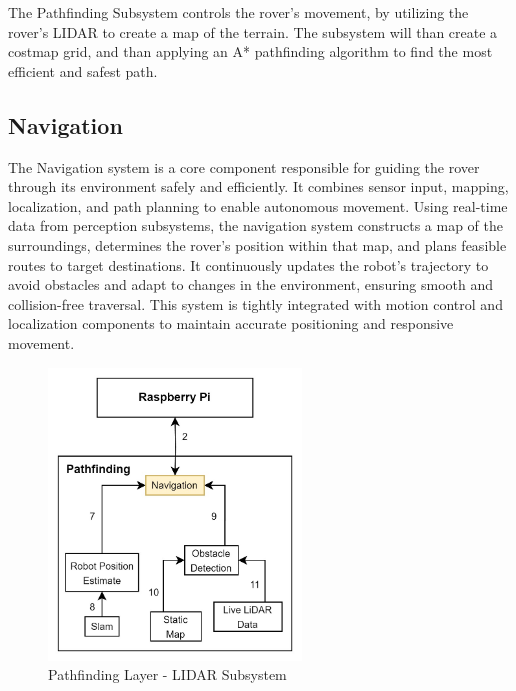 


The Pathfinding Subsystem controls the rover's movement, by utilizing the rover's LIDAR to create a map of the terrain. The subsystem will than create a costmap grid, and than applying an A* pathfinding algorithm to find the most efficient and safest path.

\subsection{Navigation}
The Navigation system is a core component responsible for guiding the rover through its environment safely and efficiently. It combines sensor input, mapping, localization, and path planning to enable autonomous movement. Using real-time data from perception subsystems, the navigation system constructs a map of the surroundings, determines the rover's position within that map, and plans feasible routes to target destinations. It continuously updates the robot's trajectory to avoid obstacles and adapt to changes in the environment, ensuring smooth and collision-free traversal. This system is tightly integrated with motion control and localization components to maintain accurate positioning and responsive movement.

\begin{figure}[h!]
	\centering
 	\includegraphics[width=0.60\textwidth]{images/pathfinding/navigation.jpg}
 \caption{Pathfinding Layer - LIDAR Subsystem}
\end{figure}


